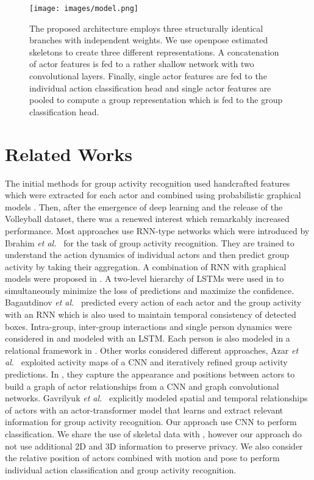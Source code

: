 \documentclass[a4paper,conference]{IEEEtran}
\newcommand{\etal}{\textit{et al.}~}
\begin{document}
\begin{figure*}
	
	\texttt{[image: images/model.png]}
	\caption{The proposed architecture employs three structurally identical branches with independent weights. We use openpose estimated skeletons to create three different representations. A concatenation of actor features is fed to a rather shallow network with two convolutional layers. Finally, single actor features are fed to the individual action classification head and single actor features are pooled to compute a group representation which is fed to the group classification head.}
	\label{fig:model}
\end{figure*}
\section{Related Works}
The initial methods for group activity recognition used handcrafted features which were extracted for each actor and combined using probabilistic graphical models \cite{amer2014hirf,choi2012unified,choi2013understanding,choi2011learning,hajimirsadeghi2015visual,lan2012social,lan2011discriminative}. Then, after the emergence of deep learning and the release of the Volleyball \cite{msibrahiCVPR16deepactivity} dataset, there was a renewed interest which remarkably increased performance. Most approaches use RNN-type networks which were introduced by Ibrahim \etal \cite{msibrahiCVPR16deepactivity} for the task of group activity recognition. They are trained to understand the action dynamics of individual actors and then predict group activity by taking their aggregation. A combination of RNN with graphical models were proposed in \cite{deng2016structure}. A two-level hierarchy of LSTMs were used in \cite{shu2017cern} to simultaneously minimize the loss of predictions and maximize the confidence. Bagautdinov \etal\cite{bagautdinov2017social} predicted every action of each actor and the group activity with an RNN which is also used to maintain temporal consistency of detected boxes. Intra-group, inter-group interactions and single person dynamics were considered in \cite{wang2017recurrent} and modeled with an LSTM. Each person is also modeled in a relational framework in \cite{ibrahim2018hierarchical}. Other works considered different approaches, Azar \etal \cite{azar2019convolutional} exploited activity maps of a CNN and iteratively refined group activity predictions. In \cite{wu2019learning}, they capture the appearance and positions between actors to build a graph of actor relationships from a CNN and graph convolutional networks. Gavrilyuk \etal \cite{gavrilyuk2020actor} explicitly modeled spatial and temporal relationships of actors with an actor-transformer model that learns and extract relevant information for group activity recognition. Our approach use CNN to perform classification. We share the use of skeletal data with \cite{gavrilyuk2020actor}, however our approach do not use additional 2D and 3D information to preserve privacy. We also consider the relative position of actors combined with motion and pose to perform individual action classification and group activity recognition. 
\end{document}
